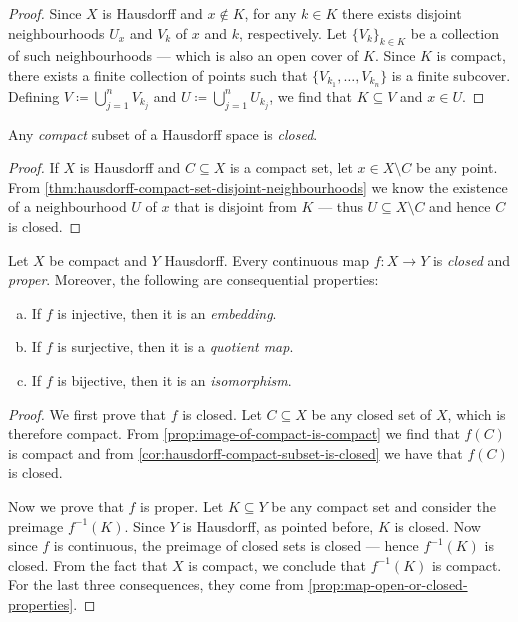 \begin{proof}
Since \(X\) is Hausdorff and \(x \notin K\), for any \(k \in K\) there exists
disjoint neighbourhoods \(U_x\) and \(V_k\) of \(x\) and \(k\),
respectively. Let \(\{V_{k}\}_{k \in K}\) be a collection of such neighbourhoods
--- which is also an open cover of \(K\). Since \(K\) is compact, there exists a
finite collection of points such that \(\{V_{k_1}, \dots, V_{k_n}\}\) is a
finite subcover. Defining \(V \coloneq \bigcup_{j=1}^n V_{k_j}\) and
\(U \coloneq \bigcup_{j=1}^n U_{k_j}\), we find that \(K \subseteq V\) and
\(x \in U\).
\end{proof}

\begin{corollary}
\label{cor:hausdorff-compact-subset-is-closed}
Any \emph{compact} subset of a Hausdorff space is \emph{closed}.
\end{corollary}

\begin{proof}
If \(X\) is Hausdorff and \(C \subseteq X\) is a compact set, let
\(x \in X \setminus C\) be any point. From
\cref{thm:hausdorff-compact-set-disjoint-neighbourhoods} we know the existence
of a neighbourhood \(U\) of \(x\) that is disjoint from \(K\) --- thus
\(U \subseteq X \setminus C\) and hence \(C\) is closed.
\end{proof}

\begin{corollary}
\label{cor:map-compact-to-hausdorff-is-closed}
Let \(X\) be compact and \(Y\) Hausdorff. Every continuous map \(f: X \to Y\) is
\emph{closed} and \emph{proper}. Moreover, the following are consequential
properties:
\begin{enumerate}[(a)]\setlength\itemsep{0em}
\item If \(f\) is injective, then it is an \emph{embedding}.
\item If \(f\) is surjective, then it is a \emph{quotient map}.
\item If \(f\) is bijective, then it is an \emph{isomorphism}.
\end{enumerate}
\end{corollary}

\begin{proof}
We first prove that \(f\) is closed. Let \(C \subseteq X\) be any closed set of
\(X\), which is therefore compact. From \cref{prop:image-of-compact-is-compact}
we find that \(f(C)\) is compact and from
\cref{cor:hausdorff-compact-subset-is-closed} we have that \(f(C)\) is closed.

Now we prove that \(f\) is proper. Let \(K \subseteq Y\) be any compact set and
consider the preimage \(f^{-1}(K)\). Since \(Y\) is Hausdorff, as pointed
before, \(K\) is closed. Now since \(f\) is continuous, the preimage of closed
sets is closed --- hence \(f^{-1}(K)\) is closed. From the fact that \(X\) is
compact, we conclude that \(f^{-1}(K)\) is compact. For the last three
consequences, they come from \cref{prop:map-open-or-closed-properties}.
\end{proof}

